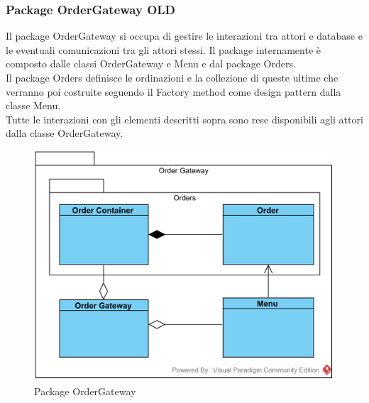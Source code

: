 \subsubsection{Package Order\-Gateway OLD}
Il package Order\-Gateway si occupa di gestire le interazioni tra attori e database e le eventuali comunicazioni tra gli attori stessi. Il package internamente è composto dalle classi Order\-Gateway e Menu e dal package Orders.\\
Il package Orders definisce le ordinazioni e la collezione di queste ultime che verranno poi costruite seguendo il Factory method come design pattern dalla classe Menu.\\
Tutte le interazioni con gli elementi descritti sopra sono rese disponibili agli attori dalla classe Order\-Gateway.
\begin{figure}[H]
	\centering
	\includegraphics[width=14cm]{diagrammi_img/classi_e_package/ordergate.png}
	\caption{Package Order\-Gateway}
\end{figure}

